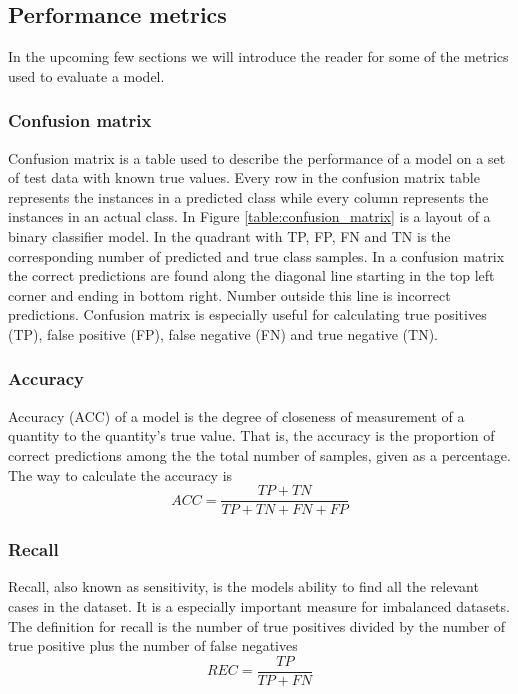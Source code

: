 \documentclass[thesis.tex]{subfiles}
\begin{document}
\subsection{Performance metrics}
In the upcoming few sections we will introduce the reader for some of the metrics used to evaluate a model.


\subsubsection{Confusion matrix}
Confusion matrix is a table used to describe the performance of a model on a set of test data with known true values. Every row in the confusion matrix table represents the instances in a predicted class while every column represents the instances in an actual class. In Figure \ref{table:confusion_matrix} is a layout of a binary classifier model. In the quadrant with TP, FP, FN and TN is the corresponding number of predicted and true class samples. In a confusion matrix the correct predictions are found along the diagonal line starting in the top left corner and ending in bottom right. Number outside this line is incorrect predictions. Confusion matrix is especially useful for calculating true positives (TP), false positive (FP), false negative (FN) and true negative (TN).

\subsubsection{Accuracy}
Accuracy (ACC) of a model is the degree of closeness of measurement of a quantity to the quantity's true value. That is, the accuracy is the proportion of correct predictions among the the total number of samples, given as a percentage. The way to calculate the accuracy is
$$ ACC = \frac{TP + TN}{TP + TN + FN + FP} $$

\subsubsection{Recall}
Recall, also known as sensitivity, is the models ability to find all the relevant cases in the dataset. It is a especially important measure for imbalanced datasets. The definition for recall is the number of true positives divided by the number of true positive plus the number of false negatives
$$ REC = \frac{TP}{TP + FN} $$
\end{document}

